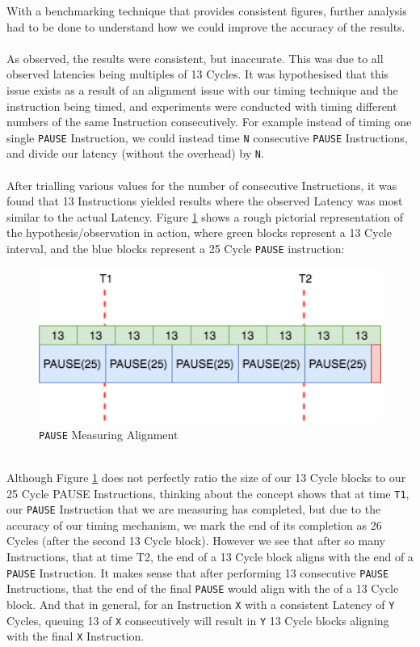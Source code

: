 \documentclass[bsc,frontabs,twoside,singlespacing,parskip,deptreport]{infthesis}     %
\begin{document}
With a benchmarking technique that provides consistent figures, further analysis had to be done to understand how we could improve the accuracy of the results. \\
\\
As observed, the results were consistent, but inaccurate. This was due to all observed latencies being multiples of 13 Cycles. It was hypothesised that this issue exists as a result of an alignment issue with our timing technique and the instruction being timed, and experiments were conducted with timing different numbers of the same Instruction consecutively. For example instead of timing one single \texttt{PAUSE} Instruction, we could instead time \texttt{N} consecutive \texttt{PAUSE} Instructions, and divide our latency (without the overhead) by \texttt{N}. \\
\\
After trialling various values for the number of consecutive Instructions, it was found that 13 Instructions yielded results where the observed Latency was most similar to the actual Latency. Figure \ref{fig:measure-alignment} shows a rough pictorial representation of the hypothesis/observation in action, where green blocks represent a 13 Cycle interval, and the blue blocks represent a 25 Cycle \texttt{PAUSE} instruction:
\\
\begin{figure}[h]
    \includegraphics[width=12cm]{MeasureAlignment.png}
    \centering
    \caption{\texttt{PAUSE} Measuring Alignment}
    \label{fig:measure-alignment}
\end{figure}
\\
Although Figure \ref{fig:measure-alignment} does not perfectly ratio the size of our 13 Cycle blocks to our 25 Cycle PAUSE Instructions, thinking about the concept shows that at time \texttt{T1}, our \texttt{PAUSE} Instruction that we are measuring has completed, but due to the accuracy of our timing mechanism, we mark the end of its completion as 26 Cycles (after the second 13 Cycle block). However we see that after so many Instructions, that at time T2, the end of a 13 Cycle block aligns with the end of a \texttt{PAUSE} Instruction. It makes sense that after performing 13 consecutive \texttt{PAUSE} Instructions, that the end of the final \texttt{PAUSE} would align with the of a 13 Cycle block. And that in general, for an Instruction \texttt{X} with a consistent Latency of \texttt{Y} Cycles, queuing 13 of \texttt{X} consecutively will result in \texttt{Y} 13 Cycle blocks aligning with the final \texttt{X} Instruction.  \\
\end{document}
